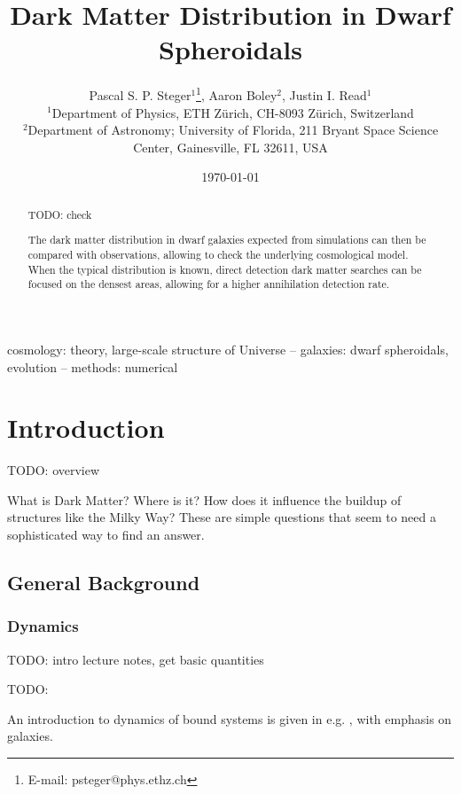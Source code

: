 \documentclass[useAMS,usenatbib]{mn2e}
\begin{document}
%
\title[Dark Matter Distribution in Dwarf Spheroidals]
      {Dark Matter Distribution in Dwarf Spheroidals}
\author[P. Steger et al.]{Pascal S. P. Steger$^{1}$\thanks{E-mail: psteger@phys.ethz.ch},
  Aaron Boley$^{2}$,
  Justin I. Read$^{1}$\\
  $^{1}$Department of Physics, ETH Z\"urich, CH-8093 Z\"urich,
  Switzerland\\
  $^{2}$Department of Astronomy; University of Florida, 211 Bryant
  Space Science Center, Gainesville, FL 32611, USA
}
%
%
\date{\today}
\pagerange{\pageref{firstpage}--\pageref{lastpage}} 
\maketitle
\label{firstpage}
\begin{abstract}
TODO: check

The dark matter distribution in dwarf galaxies expected from
simulations can then be compared with observations, allowing to check
the underlying cosmological model. When the typical distribution is
known, direct detection dark matter searches can be focused on the
densest areas, allowing for a higher annihilation detection rate.

\end{abstract}
%
\begin{keywords}
  cosmology: theory, large-scale structure of Universe --
  galaxies: dwarf spheroidals, evolution --
  methods: numerical
\end{keywords}
%
\section{Introduction}
\label{sec:intro}
TODO: overview

What is Dark Matter? Where is it? How does it influence the buildup of
structures like the Milky Way? These are simple questions that seem to
need a sophisticated way to find an answer.

\subsection{General Background}
\subsubsection{Dynamics}
TODO: intro lecture notes, get basic quantities \cite{Read2011}

TODO: 

An introduction to dynamics of bound systems is given in
e.g. \cite{TODO:BinneyTremaine}, with emphasis on galaxies.
\end{document}
